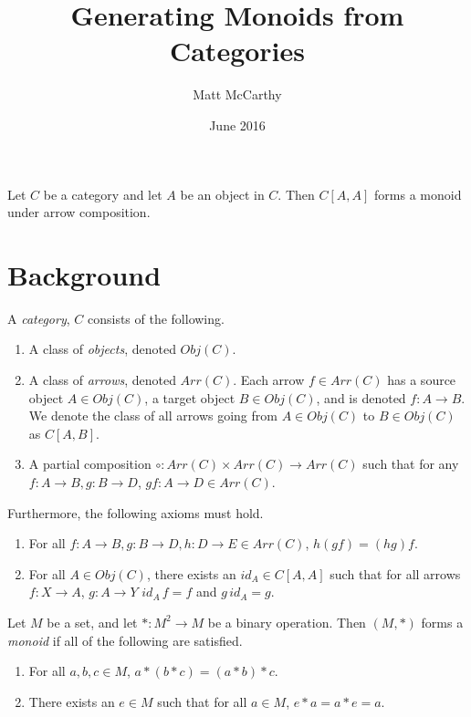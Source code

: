 \documentclass[notitlepage]{problem-solving}
\author{Matt McCarthy}
\date{June 2016}
\title{Generating Monoids from Categories}
\begin{document}
\maketitle

\begin{thm*}
	Let $C$ be a category and let $A$ be an object in $C$.
	Then $C[A,A]$ forms a monoid under arrow composition.
\end{thm*}

\section{Background}

\begin{definition}[Category]
	A \textit{category}, $C$ consists of the following.
	\begin{enumerate}
		\item A class of \textit{objects}, denoted $Obj(C)$.
		\item A class of \textit{arrows}, denoted $Arr(C)$.
		Each arrow $f\in Arr(C)$ has a source object $A\in Obj(C)$, a target object $B\in Obj(C)$, and is denoted $f:A\rightarrow B$.
		We denote the class of all arrows going from $A\in Obj(C)$ to $B\in Obj(C)$ as $C[A,B]$.
		\item A partial composition $\circ:Arr(C)\times Arr(C)\rightarrow Arr(C)$ such that for any $f:A\rightarrow B,g:B\rightarrow D$, $gf:A\rightarrow D\in Arr(C)$.
	\end{enumerate}
	Furthermore, the following axioms must hold.
	\begin{enumerate}
		\item For all $f:A\rightarrow B,g:B\rightarrow D,h:D\rightarrow E\in Arr(C)$, $h(gf) = (hg)f$.
		\item For all $A\in Obj(C)$, there exists an $id_A\in C[A,A]$ such that for all arrows $f:X\rightarrow A$, $g:A\rightarrow Y$ $id_A\, f =f$ and $g\, id_A = g$.
	\end{enumerate}
\end{definition}

\begin{definition}[Monoid]
	Let $M$ be a set, and let $*:M^2\rightarrow M$ be a binary operation.
	Then $(M,*)$ forms a \textit{monoid} if all of the following are satisfied.
	\begin{enumerate}
		\item For all $a,b,c\in M$, $a*(b*c)=(a*b)*c$.
		\item There exists an $e\in M$ such that for all $a\in M$, $e*a=a*e=a$.
	\end{enumerate}
\end{definition}
\end{document}

